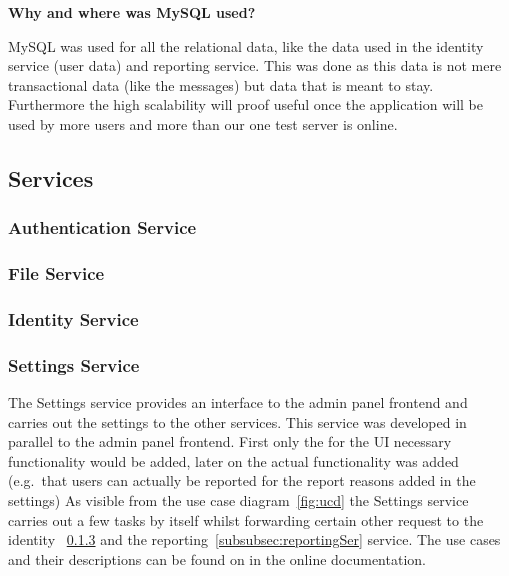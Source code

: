 \textbf{Why and where was MySQL used?}

MySQL was used for all the relational data, like the data used in the identity service (user data) and reporting service. This was done as this data is not mere transactional data (like the messages) but data that is meant to stay. Furthermore the high scalability will proof useful once the application will be used by more users and more than our one test server is online.
\subsection{Services}

\subsubsection{Authentication Service}

\subsubsection{File Service}

\subsubsection{Identity Service}
\label{subsubsec:identitySer}

\subsubsection{Settings Service}
\label{subsubsec:settingsSer}
The Settings service provides an interface to the admin panel frontend and carries out the settings to the other services.
This service was developed in parallel to the admin panel frontend. %
First only the for the UI necessary functionality would be added, later on the actual functionality was added (e.g.\ that users can actually be reported for the report reasons added in the settings)
As visible from the use case diagram~\ref{fig:ucd} the Settings service carries out a few tasks by itself whilst forwarding
certain other request to the identity ~\ref{subsubsec:identitySer} and the reporting~\ref{subsubsec:reportingSer} service.
The use cases and their descriptions can be found on in the online documentation.

